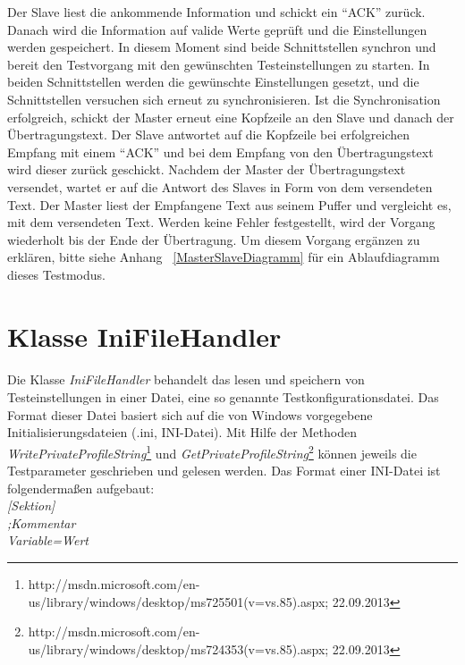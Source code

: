 Der Slave liest die ankommende Information und schickt ein "`ACK"' zurück. Danach wird die Information auf valide Werte geprüft und die Einstellungen werden gespeichert. In diesem Moment sind beide Schnittstellen synchron und bereit den Testvorgang mit den gewünschten Testeinstellungen zu starten. In beiden Schnittstellen werden die gewünschte Einstellungen gesetzt, und die Schnittstellen versuchen sich erneut zu synchronisieren. Ist die Synchronisation erfolgreich, schickt der Master erneut eine Kopfzeile an den Slave und danach der Übertragungstext. Der Slave antwortet auf die Kopfzeile bei erfolgreichen Empfang mit einem "`ACK"' und bei dem Empfang von den Übertragungstext wird dieser zurück geschickt. Nachdem der Master der Übertragungstext versendet, wartet er auf die Antwort des Slaves in Form von dem versendeten Text. Der Master liest der Empfangene Text aus seinem Puffer und vergleicht es, mit dem versendeten Text. Werden keine Fehler festgestellt, wird der Vorgang wiederholt bis der Ende der Übertragung. Um diesem Vorgang ergänzen zu erklären, bitte siehe Anhang ~\ref{MasterSlaveDiagramm} für ein Ablaufdiagramm dieses Testmodus.


\newpage


\section{Klasse IniFileHandler}\label{IniFileHandler}
\paragraph{}
Die Klasse \textit{IniFileHandler} behandelt das lesen und speichern von Testeinstellungen in einer Datei, eine so genannte Testkonfigurationsdatei. Das Format dieser Datei basiert sich auf die von Windows vorgegebene Initialisierungsdateien (.ini, INI-Datei). Mit Hilfe der Methoden \textit{WritePrivateProfileString}\footnote{http://msdn.microsoft.com/en-us/library/windows/desktop/ms725501(v=vs.85).aspx; 22.09.2013} und \textit{GetPrivateProfileString}\footnote{http://msdn.microsoft.com/en-us/library/windows/desktop/ms724353(v=vs.85).aspx; 22.09.2013} können jeweils die Testparameter geschrieben und gelesen werden. Das Format einer INI-Datei ist folgendermaßen aufgebaut:\\

\hspace*{20mm}\textit{[Sektion]}    \\
\hspace*{20mm}\textit{;Kommentar}    \\
\hspace*{20mm}\textit{Variable=Wert}\\

